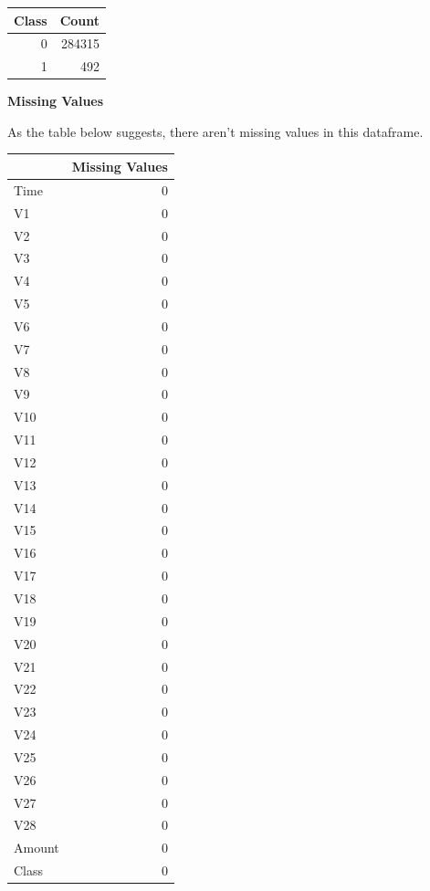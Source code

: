 \documentclass[]{article}
\begin{document}
\begin{table}[H]
\centering\begingroup\fontsize{10}{12}\selectfont

\begin{tabular}{r|r}
\hline
Class & Count\\
\hline
0 & 284315\\
\hline
1 & 492\\
\hline
\end{tabular}
\endgroup{}
\end{table}
\newpage

\textbf{Missing Values}

As the table below suggests, there aren't missing values in this
dataframe.

\begin{table}[H]
\centering\begingroup\fontsize{10}{12}\selectfont

\begin{tabular}{l|r}
\hline
  & Missing Values\\
\hline
Time & 0\\
\hline
V1 & 0\\
\hline
V2 & 0\\
\hline
V3 & 0\\
\hline
V4 & 0\\
\hline
V5 & 0\\
\hline
V6 & 0\\
\hline
V7 & 0\\
\hline
V8 & 0\\
\hline
V9 & 0\\
\hline
V10 & 0\\
\hline
V11 & 0\\
\hline
V12 & 0\\
\hline
V13 & 0\\
\hline
V14 & 0\\
\hline
V15 & 0\\
\hline
V16 & 0\\
\hline
V17 & 0\\
\hline
V18 & 0\\
\hline
V19 & 0\\
\hline
V20 & 0\\
\hline
V21 & 0\\
\hline
V22 & 0\\
\hline
V23 & 0\\
\hline
V24 & 0\\
\hline
V25 & 0\\
\hline
V26 & 0\\
\hline
V27 & 0\\
\hline
V28 & 0\\
\hline
Amount & 0\\
\hline
Class & 0\\
\hline
\end{tabular}
\endgroup{}
\end{table}
\end{document}
